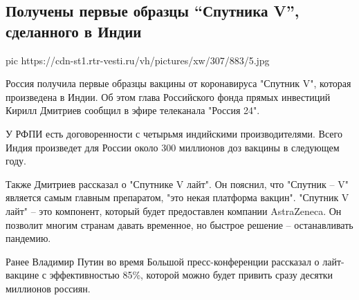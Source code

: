  
 
 
 
 
 
\subsection{Получены первые образцы \enquote{Спутника V}, сделанного в Индии}
\label{sec:17_12_2020.news.ru.vesti.3.india_sputnik_v}

\ifcmt
pic https://cdn-st1.rtr-vesti.ru/vh/pictures/xw/307/883/5.jpg
\fi

Россия получила первые образцы вакцины от коронавируса "Спутник V", которая
произведена в Индии. Об этом глава Российского фонда прямых инвестиций Кирилл
Дмитриев сообщил в эфире телеканала "Россия 24".

У РФПИ есть договоренности с четырьмя индийскими производителями. Всего Индия
произведет для России около 300 миллионов доз вакцины в следующем году.

Также Дмитриев рассказал о "Спутнике V лайт". Он пояснил, что "Спутник – V"
является самым главным препаратом, "это некая платформа вакцин". "Спутник V
лайт" – это компонент, который будет предоставлен компании AstraZeneca. Он
позволит многим странам давать временное, но быстрое решение – останавливать
пандемию.

Ранее Владимир Путин во время Большой пресс-конференции рассказал о
лайт-вакцине с эффективностью 85\%, которой можно будет привить сразу десятки
миллионов россиян.
